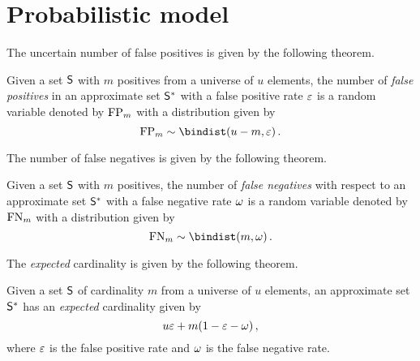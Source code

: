 \documentclass[ ../main.tex]{subfiles}
\begin{document}
\section{Probabilistic model}
\label{sec:prob_model}
The uncertain number of false positives is given by the following theorem.
\begin{theorem}
\label{thm:fpbinom}
Given a set $\Set{S}$ with $m$ positives from a universe of $u$ elements, the number of \emph{false positives} in an approximate set $\ASet{S}$ with a false positive rate $\varepsilon$ is a random variable denoted by $\mathrm{FP}_m$ with a distribution given by
\begin{equation}
    \FP_m \sim \bindist(u - m, \fprate)\,.
\end{equation}
\end{theorem}

The number of false negatives is given by the following theorem.
\begin{theorem}
\label{thm:fnbinom}
Given a set $\Set{S}$ with $m$ positives, the number of \emph{false negatives} with respect to an approximate set $\ASet{S}$ with a false negative rate $\omega$ is a random variable denoted by $\mathrm{FN}_m$ with a distribution given by
\begin{equation}
    \FN_m \sim \bindist(m, \fnrate)\,.
\end{equation}
\end{theorem}

The \emph{expected} cardinality is given by the following theorem.
\begin{theorem}[Cardinality]
Given a set $\Set{S}$ of cardinality $m$ from a universe of $u$ elements, an approximate set $\ASet{S}$ has an \emph{expected} cardinality given by
\begin{equation}
\label{eq:exp_card}
    u \varepsilon + m (1 - \varepsilon - \omega)\,,
\end{equation}
where $\varepsilon$ is the false positive rate and $\omega$ is the false negative rate.
\end{theorem}
\end{document}
